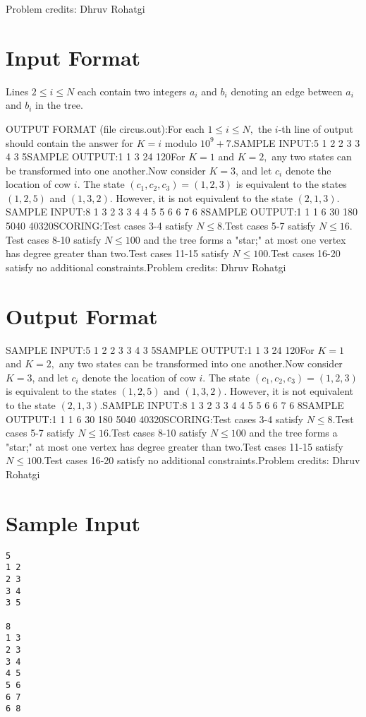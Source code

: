 \documentclass[12pt]{article}
\begin{document}
Problem credits: Dhruv Rohatgi



\section*{Input Format}
Lines $2\le i\le N$ each contain two integers $a_i$ and $b_i$ denoting an edge
between $a_i$ and $b_i$ in the tree.

OUTPUT FORMAT (file circus.out):For each $1\le i\le N,$ the $i$-th line of output should contain the answer for
$K=i$ modulo $10^9+7$.SAMPLE INPUT:5
1 2
2 3
3 4
3 5SAMPLE OUTPUT:1
1
3
24
120For $K=1$ and $K=2,$ any two states can be transformed into one another.Now consider $K=3$, and let $c_i$ denote the location of cow $i$. The state
$(c_1,c_2,c_3)=(1,2,3)$ is equivalent to the states $(1,2,5)$ and $(1,3,2).$
However, it is not equivalent to the state $(2,1,3).$SAMPLE INPUT:8
1 3
2 3
3 4
4 5
5 6
6 7
6 8SAMPLE OUTPUT:1
1
1
6
30
180
5040
40320SCORING:Test cases 3-4 satisfy $N\le 8.$Test cases 5-7 satisfy $N\le 16.$Test cases 8-10 satisfy $N\le 100$ and the tree forms a "star;" at most one
vertex has degree greater than two.Test cases 11-15 satisfy $N\le 100$.Test cases 16-20 satisfy no additional constraints.Problem credits: Dhruv Rohatgi

\section*{Output Format}
SAMPLE INPUT:5
1 2
2 3
3 4
3 5SAMPLE OUTPUT:1
1
3
24
120For $K=1$ and $K=2,$ any two states can be transformed into one another.Now consider $K=3$, and let $c_i$ denote the location of cow $i$. The state
$(c_1,c_2,c_3)=(1,2,3)$ is equivalent to the states $(1,2,5)$ and $(1,3,2).$
However, it is not equivalent to the state $(2,1,3).$SAMPLE INPUT:8
1 3
2 3
3 4
4 5
5 6
6 7
6 8SAMPLE OUTPUT:1
1
1
6
30
180
5040
40320SCORING:Test cases 3-4 satisfy $N\le 8.$Test cases 5-7 satisfy $N\le 16.$Test cases 8-10 satisfy $N\le 100$ and the tree forms a "star;" at most one
vertex has degree greater than two.Test cases 11-15 satisfy $N\le 100$.Test cases 16-20 satisfy no additional constraints.Problem credits: Dhruv Rohatgi

\section*{Sample Input}
\begin{verbatim}
5
1 2
2 3
3 4
3 5

8
1 3
2 3
3 4
4 5
5 6
6 7
6 8
\end{verbatim}
\end{document}
